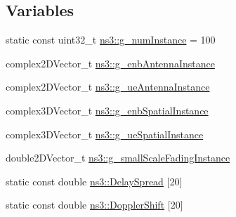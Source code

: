 \subsection*{Variables}
\begin{DoxyCompactItemize}
\item 
static const uint32\+\_\+t \hyperlink{namespacens3_a98a468dea86ef5e50032c3830b2221bd}{ns3\+::g\+\_\+num\+Instance} = 100
\item 
complex2\+D\+Vector\+\_\+t \hyperlink{namespacens3_a827a472724f90c8c760a2c3c9a8dde7f}{ns3\+::g\+\_\+enb\+Antenna\+Instance}
\item 
complex2\+D\+Vector\+\_\+t \hyperlink{namespacens3_a66276c7aee6abe4c6eee2fc7afca5b53}{ns3\+::g\+\_\+ue\+Antenna\+Instance}
\item 
complex3\+D\+Vector\+\_\+t \hyperlink{namespacens3_afc45dc6f6bc8f2231642ae6ed70787c1}{ns3\+::g\+\_\+enb\+Spatial\+Instance}
\item 
complex3\+D\+Vector\+\_\+t \hyperlink{namespacens3_a7979fdfb339164116e12d41020b221f7}{ns3\+::g\+\_\+ue\+Spatial\+Instance}
\item 
double2\+D\+Vector\+\_\+t \hyperlink{namespacens3_a3d08819e638c86c682e9866b22bb286c}{ns3\+::g\+\_\+small\+Scale\+Fading\+Instance}
\item 
static const double \hyperlink{namespacens3_afee438cc28b5157f0eae04be102e5622}{ns3\+::\+Delay\+Spread} \mbox{[}20\mbox{]}
\item 
static const double \hyperlink{namespacens3_a927629da5996dd485d847a37aa7b3fd1}{ns3\+::\+Doppler\+Shift} \mbox{[}20\mbox{]}
\end{DoxyCompactItemize}
